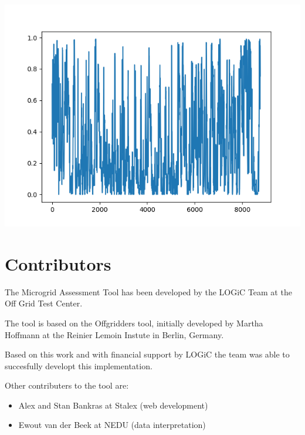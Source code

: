 \documentclass{article}[11pt]
\begin{document}
\begin{multicols}{2}
\begin{center}
\includegraphics[width=\linewidth]{per_unit_wind_generation.png}

\end{center}








\end{multicols}\section*{Contributors}\begin{multicols}{2}\setlength{\parindent}{0pt}

The Microgrid Assessment Tool has been developed by the LOGiC Team at the Off Grid Test Center. 

The tool is based on the Offgridders tool, initially developed by Martha Hoffmann at the Reinier Lemoin Instute in Berlin, Germany. 

Based on this work and with financial support by LOGiC the team was able to succesfully developt this implementation. 

Other contributers to the tool are: 

\begin{itemize}

\item Alex and Stan Bankras at Stalex (web development)

\item Ewout van der Beek at NEDU (data interpretation)


\end{itemize}
\end{multicols}
\end{document}
